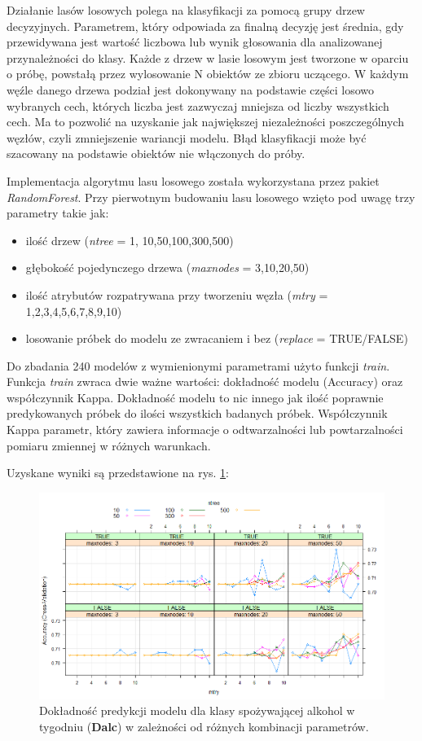 Działanie lasów losowych polega na klasyfikacji za pomocą grupy drzew decyzyjnych. Parametrem, który odpowiada za finalną decyzję jest średnia, gdy przewidywana jest wartość liczbowa lub wynik głosowania dla analizowanej przynależności do klasy. Każde z drzew w lasie losowym jest tworzone w oparciu o próbę, powstałą przez wylosowanie N obiektów ze zbioru uczącego. W każdym węźle danego drzewa podział jest dokonywany na podstawie części losowo wybranych cech, których liczba jest zazwyczaj mniejsza od liczby wszystkich cech. Ma to pozwolić na uzyskanie jak największej niezależności poszczególnych węzłów, czyli zmniejszenie wariancji modelu.
Błąd klasyfikacji może być szacowany na podstawie obiektów nie włączonych do próby.

Implementacja algorytmu lasu losowego została wykorzystana przez pakiet \textit{RandomForest}. Przy pierwotnym budowaniu lasu losowego wzięto pod uwagę trzy parametry takie jak:
\begin{itemize}
    \item ilość drzew (\textit{ntree} = {1, 10,50,100,300,500})
    \item głębokość pojedynczego drzewa (\textit{maxnodes} = {3,10,20,50})
    \item ilość atrybutów rozpatrywana przy tworzeniu węzła (\textit{mtry} = {1,2,3,4,5,6,7,8,9,10})
    \item losowanie próbek do modelu ze zwracaniem i bez (\textit{replace} = {TRUE/FALSE})
\end{itemize}
Do zbadania 240 modelów z wymienionymi parametrami użyto funkcji \textit{train}. 
Funkcja \textit{train} zwraca dwie ważne wartości: dokładność modelu (Accuracy) oraz współczynnik Kappa. Dokładność modelu to nic innego jak ilość poprawnie predykowanych próbek do ilości wszystkich badanych próbek. Współczynnik Kappa parametr, który zawiera informacje o odtwarzalności lub powtarzalności pomiaru zmiennej w różnych warunkach. 

Uzyskane wyniki są przedstawione na rys. \ref{fig:all_Dalc}:

\begin{figure}[h]
 \centering 
 \includegraphics[scale=0.60]{tex/customD_vol4.png}
 \caption{Dokładność predykcji modelu dla klasy spożywającej alkohol w tygodniu (\textbf{Dalc}) w zależności od różnych kombinacji parametrów.}
 \label{fig:all_Dalc}
\end{figure}

